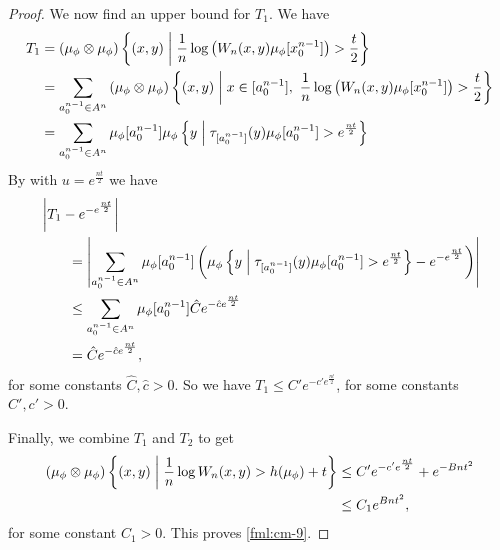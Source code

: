 \begin{theorem}
\begin{proof}
		We now find an upper bound for $T_1$. We have
		\begin{align*}
			T_1 &= (\mu_\phi \otimes \mu_\phi)\left\{(x, y) \midmid \frac{1}{n}\log\left(W_n(x, y) \mu_\phi[x_0^{n - 1}]\right) > \frac{t}{2}\right\} \\
				&= \sum_{a_0^{n - 1} \in A^n}{(\mu_\phi \otimes \mu_\phi)\left\{(x, y) \midmid x \in [a_0^{n - 1}],\ \frac{1}{n}\log\left(W_n(x, y) \mu_\phi[x_0^{n - 1}]\right) > \frac{t}{2}\right\}} \\
				&= \sum_{a_0^{n - 1} \in A^n}{\mu_\phi[a_0^{n - 1}] \mu_\phi\left\{y \midmid \tau_{[a_0^{n - 1}]}(y) \mu_\phi[a_0^{n - 1}] > e^\frac{nt}{2}\right\}}
		\end{align*}
		By  with $u = e^\frac{nt}{2}$ we have
		\begin{align*}
			&\left|T_1 - e^{-e^\frac{nt}{2}}\right| \\
				& \qquad = \left|\sum_{a_0^{n - 1} \in A^n}\mu_\phi[a_0^{n - 1}]\left(\mu_\phi\left\{y \mathrel{}\middle|\mathrel{} \tau_{[a_0^{n - 1}]}(y) \mu_\phi[a_0^{n - 1}] > e^\frac{nt}{2}\right\} - e^{-e^\frac{nt}{2}}\right)\right| \\
				& \qquad \leq \sum_{a_0^{n - 1} \in A^n}\mu_\phi[a_0^{n - 1}] \hat{C}e^{-\hat{c}e^\frac{nt}{2}} \\
				& \qquad = \hat{C}e^{-\hat{c}e^\frac{nt}{2}},
		\end{align*}
		for some constants $\hat{C}, \hat{c} > 0$. So we have $T_1 \leq C'e^{-c'e^\frac{nt}{2}}$, for some constants $C', c' > 0$.
		
		Finally, we combine $T_1$ and $T_2$ to get
		\begin{align*}
			(\mu_\phi \otimes \mu_\phi)\left\{(x, y) \mathrel{}\middle|\mathrel{} \frac{1}{n}\log{W_n(x, y)} > h(\mu_\phi) + t\right\} &\leq C'e^{-c'e^\frac{nt}{2}} + e^{-Bnt^2} \\
				& \leq C_1 e^{Bnt^2},
		\end{align*}
		for some constant $C_1 > 0$. This proves \eqref{fml:cm-9}.
		

\end{proof}
\end{theorem}
